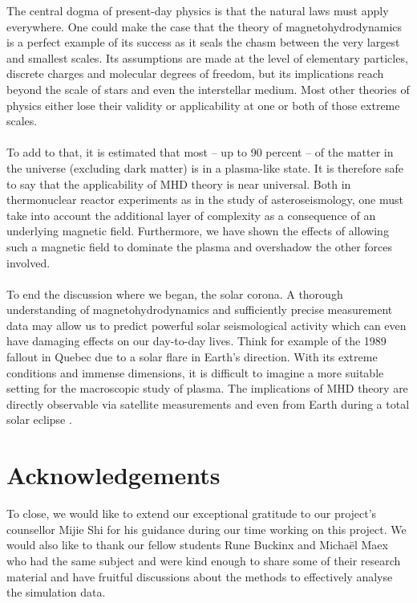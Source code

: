 The central dogma of present-day physics is that the natural laws must apply everywhere. 
One could make the case that the theory of magnetohydrodynamics is a perfect example of its success as it seals the chasm between the very largest and smallest scales. 
Its assumptions are made at the level of elementary particles, discrete charges and molecular degrees of freedom, but its implications reach beyond the scale of stars and even the interstellar medium. 
Most other theories of physics either lose their validity or applicability at one or both of those extreme scales.\\
\\
To add to that, it is estimated that most – up to 90 percent \cite{notes-principles-MHD}– of the matter in the universe (excluding dark matter) is in a plasma-like state. 
It is therefore safe to say that the applicability of MHD theory is near universal. 
Both in thermonuclear reactor experiments as in the study of asteroseismology, one must take into account the additional layer of complexity as a consequence of an underlying magnetic field. 
Furthermore, we have shown the effects of allowing such a magnetic field to dominate the plasma and overshadow the other forces involved.\\ 
\\
To end the discussion where we began, the solar corona. 
A thorough understanding of magnetohydrodynamics and sufficiently precise measurement data may allow us to predict powerful solar seismological activity which can even have damaging effects on our day-to-day lives. 
Think for example of the 1989 fallout in Quebec due to a solar flare in Earth’s direction. 
With its extreme conditions and immense dimensions, it is difficult to imagine a more suitable setting for the macroscopic study of plasma. 
The implications of MHD theory are directly observable via satellite measurements \cite{article2} and even from Earth during a total solar eclipse \cite{notes-principles-MHD}.
 
 

\section*{Acknowledgements}
To close, we would like to extend our exceptional gratitude to our project’s counsellor Mijie Shi for his guidance during our time working on this project. 
We would also like to thank our fellow students Rune Buckinx and Michaël Maex who had the same subject and were kind enough to share some of their research material and have fruitful discussions about the methods to effectively analyse the simulation data.

